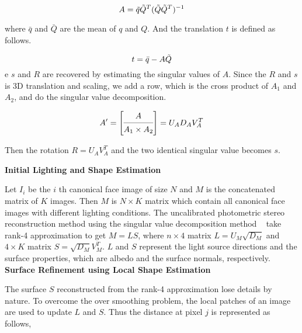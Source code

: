 \documentclass[10pt]{article}
\begin{document}
\begin{equation}
 A = \tilde{q}\tilde{Q}^T( \tilde{Q}\tilde{Q}^T )^{-1} \\
\end{equation}

where $\bar{q}$ and $\bar{Q}$ are the mean of $q$ and $Q$. 
And the translation $t$ is defined as follows.

\begin{equation}
 t = \bar{q} - A\tilde{Q} \\
\end{equation}
e
$s$ and $R$ are recovered by estimating the singular values of $A$. 
Since the $R$ and $s$ is 3D translation and scaling, we add a row, which is the cross product of $A_1$ and $A_2$, and do the singular value decomposition.

\begin{equation}
  A' = \begin{bmatrix} A \\ \cmidrule(lr){1-1} A_1 \times A_2  \end{bmatrix} = U_AD_AV_A^T \\
\end{equation}

Then the rotation $R = U_AV_A^T$ and the two identical singular value becomes $s$.

\noindent \textbf{Initial Lighting and Shape Estimation \\}

Let $I_i$ be the $i$ th canonical face image of size $N$ and $M$ is the concatenated matrix of $K$ images.
Then $M$ is $N \times K$ matrix which contain all canonical face images with different lighting conditions.
The uncalibrated photometric stereo reconstruction method using the singular value decomposition method ~\cite{YuilleSEB99} 
take rank-4 approximation to get $M = LS$, where $n \times 4$ matrix $L = U_M \sqrt{D_M}$ and $4\times K$ matrix $S = \sqrt{D_M}V_M^T$.
$L$ and $S$ represent the light source directions and the surface properties, which are albedo and the surface normals, respectively.  \\

\noindent \textbf{Surface Refinement using Local Shape Estimation \\}

The surface $S$ reconstructed from the rank-4 approximation lose details by nature. 
To overcome the over smoothing problem, the local patches of an image are used to update $L$ and $S$.
Thus the distance at pixel $j$ is represented as follows, 
\end{document}
